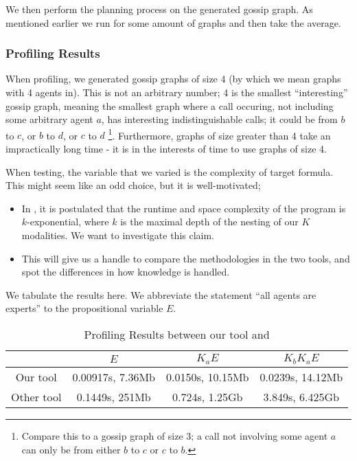 \documentclass[12pt, a4paper]{article}
\begin{document}
We then perform the planning process on the generated gossip graph. As mentioned
earlier we run for some amount of graphs and then take the average.

\subsubsection{Profiling Results}

When profiling, we generated gossip graphs of size 4 (by which we mean graphs
with 4 agents in). This is not an arbitrary number; 4 is the smallest
``interesting'' gossip graph, meaning the smallest graph where a call occuring,
not including some arbitrary agent $a$, has interesting indistinguishable calls;
it could be from $b$ to $c$, or $b$ to $d$, or $c$ to $d$ \footnote{Compare this
  to a gossip graph of size 3; a call not involving some agent $a$ can only be
  from either $b$ to $c$ or $c$ to $b$.}. Furthermore, graphs of size greater
than 4 take an impractically long time - it is in the interests of time to use
graphs of size 4.

When testing, the variable that we varied is the complexity of target formula.
This might seem like an odd choice, but it is well-motivated;

\begin{itemize}
\item In \cite{AutomataTechniques}, it is postulated that the runtime and space
  complexity of the program is $k$-exponential, where $k$ is the maximal depth
  of the nesting of our $K$ modalities. We want to investigate this claim.
\item This will give us a handle to compare the methodologies in the two tools,
  and spot the differences in how knowledge is handled.
\end{itemize}

\bigskip

We tabulate the results here. We abbreviate the statement ``all agents are
experts'' to the propositional variable $E$. 

\begin{table}[h]
  \centering
  \begin{tabular}{|c||c|c|c|}
    \hline
    & $E$ & $ K_a E$ & $K_b K_a E$  \\ \hline 
    Our tool   & 0.00917s, 7.36Mb  & 0.0150s, 10.15Mb & 0.0239s, 14.12Mb \\ \hline 
    Other tool & 0.1449s, 251Mb & 0.724s, 1.25Gb & 3.849s, 6.425Gb \\ 
    \hline
  \end{tabular}
  \caption{Profiling Results between our tool and \cite{GithubGossip}}
  \label{tab:Proflining1}
\end{table}
\end{document}
